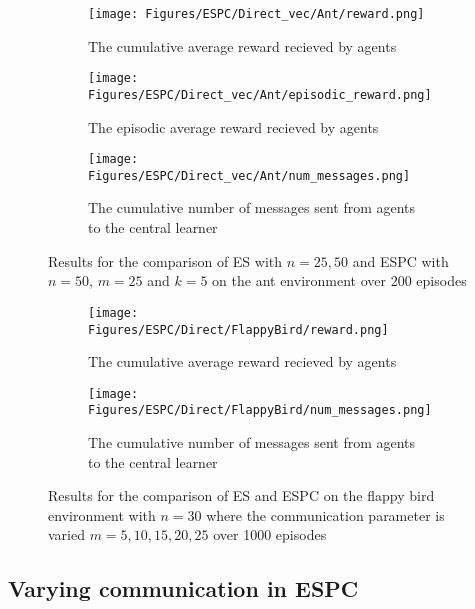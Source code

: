 \begin{figure}
    \centering
    \begin{subfigure}{0.5\textwidth}
        \centering
        \texttt{[image: Figures/ESPC/Direct\_vec/Ant/reward.png]}
        \caption{The cumulative average reward recieved by agents}
        \label{fig:AntReward}
    \end{subfigure}
    \begin{subfigure}{0.5\textwidth}
        \centering
        \texttt{[image: Figures/ESPC/Direct\_vec/Ant/episodic\_reward.png]}
        \caption{The episodic average reward recieved by agents}
        \label{fig:AntEpisodicReward}
    \end{subfigure}
    \begin{subfigure}{0.5\textwidth}
        \centering
        \texttt{[image: Figures/ESPC/Direct\_vec/Ant/num\_messages.png]}
        \caption{The cumulative number of messages sent from agents to the central learner}
        \label{fig:AntMessages}
    \end{subfigure}
    \caption{Results for the comparison of ES with $n=25,50$ and ESPC with $n=50$, $m=25$ and $k=5$ on the ant environment over 200 episodes}
    \label{fig:DirectAnt}
\end{figure}

\begin{figure}
    \centering
    \begin{subfigure}{0.8\textwidth}
        \centering
        \texttt{[image: Figures/ESPC/Direct/FlappyBird/reward.png]}
        \caption{The cumulative average reward recieved by agents}
        \label{fig:FBReward}
    \end{subfigure}
    \begin{subfigure}{0.8\textwidth}
        \centering
        \texttt{[image: Figures/ESPC/Direct/FlappyBird/num\_messages.png]}
        \caption{The cumulative number of messages sent from agents to the central learner}
        \label{fig:FBMessages}
    \end{subfigure}
    \caption{Results for the comparison of ES and ESPC on the flappy bird environment with $n=30$ where the communication parameter is varied $m=5,10,15,20,25$ over 1000 episodes}
    \label{fig:DirectFB}
\end{figure}

\subsection{Varying communication in ESPC}

